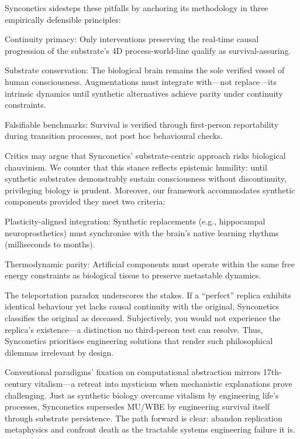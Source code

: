 \documentclass[10pt]{article}
\begin{document}
\begin{sloppypar}
  Synconetics sidesteps these pitfalls by anchoring its methodology in three empirically defensible principles:

  Continuity primacy: Only interventions preserving the real-time causal progression of the substrate’s 4D process-world-line qualify as survival-assuring.

  Substrate conservation: The biological brain remains the sole verified vessel of human consciousness. Augmentations must integrate with—not replace—its intrinsic dynamics until synthetic alternatives achieve parity under continuity constraints.

  Falsifiable benchmarks: Survival is verified through first-person reportability during transition processes, not post hoc behavioural checks.

  Critics may argue that Synconetics’ substrate-centric approach risks biological chauvinism. We counter that this stance reflects epistemic humility: until synthetic substrates demonstrably sustain consciousness without discontinuity, privileging biology is prudent. Moreover, our framework accommodates synthetic components provided they meet two criteria:

  Plasticity-aligned integration: Synthetic replacements (e.g., hippocampal neuroprosthetics) must synchronise with the brain’s native learning rhythms (milliseconds to months).

  Thermodynamic parity: Artificial components must operate within the same free energy constraints as biological tissue to preserve metastable dynamics.

  The teleportation paradox underscores the stakes. If a “perfect” replica exhibits identical behaviour yet lacks causal continuity with the original, Synconetics classifies the original as deceased. Subjectively, you would not experience the replica’s existence—a distinction no third-person test can resolve. Thus, Synconetics prioritises engineering solutions that render such philosophical dilemmas irrelevant by design.

  Conventional paradigms’ fixation on computational abstraction mirrors 17th-century vitalism—a retreat into mysticism when mechanistic explanations prove challenging. Just as synthetic biology overcame vitalism by engineering life’s processes, Synconetics supersedes MU/WBE by engineering survival itself through substrate persistence. The path forward is clear: abandon replication metaphysics and confront death as the tractable systems engineering failure it is.


\end{sloppypar}
\end{document}
